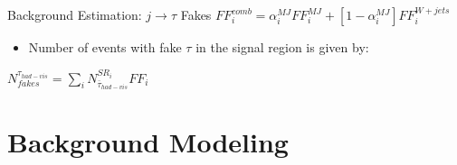 \documentclass[aspectratio=169,xcolor=table]{beamer}
\begin{document}
\begin{frame}[t]{Background Estimation: $j \rightarrow \tau$ Fakes}
          $FF^{comb}_{i}=\alpha^{MJ}_{i} FF^{MJ}_{i} + [1-\alpha^{MJ}_{i}]FF^{W+jets}_{i}$
        \begin{itemize}
        \item Number of events with fake $\tau$ in the signal region is given by:
      \end{itemize}
        \centering
        $N^{\tau_{had-vis}}_{fakes} = \sum\limits_{i} N^{SR_{i}}_{\bar{\tau}_{had-vis}} FF_{i}$
    \end{frame}

  \section{Background Modeling }
\end{document}
